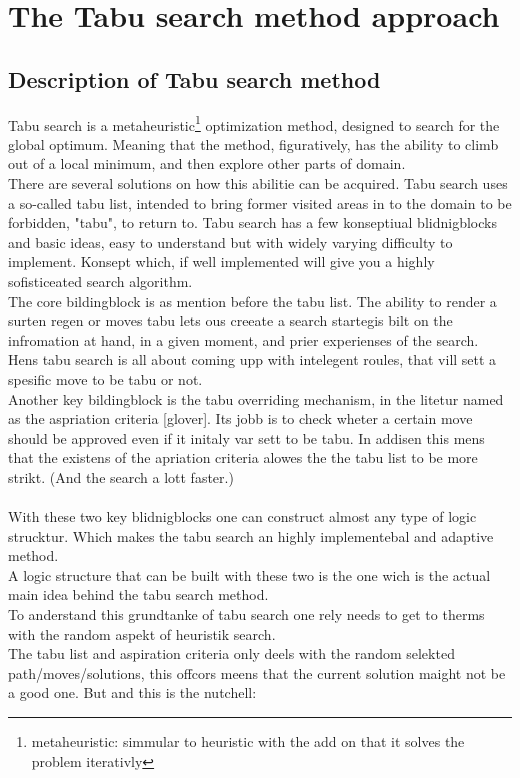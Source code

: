 \section{The Tabu search method approach}

\subsection{Description of Tabu search method}

Tabu search is a metaheuristic\footnote{ metaheuristic: simmular to heuristic  with the add on that it solves the problem iterativly}  optimization method, designed to search for the global optimum. Meaning that the method, figuratively, has the ability to climb out of a local minimum, and then explore other parts of domain.\\
There are several solutions on how this abilitie can be acquired. Tabu search uses a so-called tabu list, intended to bring former visited areas in to the domain to be forbidden, "tabu", to return to.
Tabu search has a few konseptiual blidnigblocks and basic ideas, easy to understand but with widely varying difficulty to implement. Konsept which, if well implemented will give you a highly sofisticeated search algorithm.\\
The core bildingblock is as mention before the tabu list. The ability to render a surten regen or moves tabu lets ous creeate a search startegis bilt on the infromation at hand, in a given moment, and prier experienses of the search. Hens tabu search is all about coming upp with intelegent roules, that vill sett a spesific move to be tabu or not.\\ 
Another key bildingblock is the tabu overriding mechanism, in the litetur named as the aspriation criteria [glover]. Its jobb is to check wheter a certain move should be approved even if it initaly var sett to be tabu. In addisen this mens that the existens of the apriation criteria alowes the the tabu list to be more strikt. (And the search a lott faster.)\\
\\
With these two key blidnigblocks one can construct almost any type of logic strucktur. Which makes the tabu search an highly implementebal and adaptive method.\\
A logic structure  that can be built with these two is the one wich is the actual main idea behind the tabu search method.\\
To anderstand this grundtanke of tabu search one rely needs to get to therms with the random aspekt of heuristik search.\\ 
The tabu list and aspiration criteria only deels with the random selekted path/moves/solutions, this offcors meens that the current solution maight not be a good one. But and this is the nutchell:\\ 

